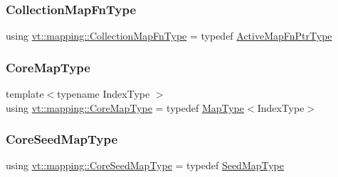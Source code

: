 \subsubsection{\texorpdfstring{Collection\+Map\+Fn\+Type}{CollectionMapFnType}}
{\footnotesize\ttfamily using \hyperlink{namespacevt_1_1mapping_a2910ab582d95478603cdca7480af65b2}{vt\+::mapping\+::\+Collection\+Map\+Fn\+Type} = typedef \hyperlink{namespacevt_1_1mapping_a748d5efb71ca5878288d5809f57d7254}{Active\+Map\+Fn\+Ptr\+Type}}

\mbox{\label{namespacevt_1_1mapping_abff207bec72f006a2e66ff14fc51255a}} 
\subsubsection{\texorpdfstring{Core\+Map\+Type}{CoreMapType}}
{\footnotesize\ttfamily template$<$typename Index\+Type $>$ \\
using \hyperlink{namespacevt_1_1mapping_abff207bec72f006a2e66ff14fc51255a}{vt\+::mapping\+::\+Core\+Map\+Type} = typedef \hyperlink{namespacevt_1_1mapping_a443f8bb8920af5ae1d3391f61fe492a6}{Map\+Type}$<$Index\+Type$>$}

\mbox{\label{namespacevt_1_1mapping_a963a37316992c8805e9a381a07380de0}} 
\subsubsection{\texorpdfstring{Core\+Seed\+Map\+Type}{CoreSeedMapType}}
{\footnotesize\ttfamily using \hyperlink{namespacevt_1_1mapping_a963a37316992c8805e9a381a07380de0}{vt\+::mapping\+::\+Core\+Seed\+Map\+Type} = typedef \hyperlink{namespacevt_1_1mapping_a1c1409d9af8d1ac402af022a65be4a4d}{Seed\+Map\+Type}}

\mbox{\label{namespacevt_1_1mapping_a433597bc51c453de93aeb1312676c70c}} 
